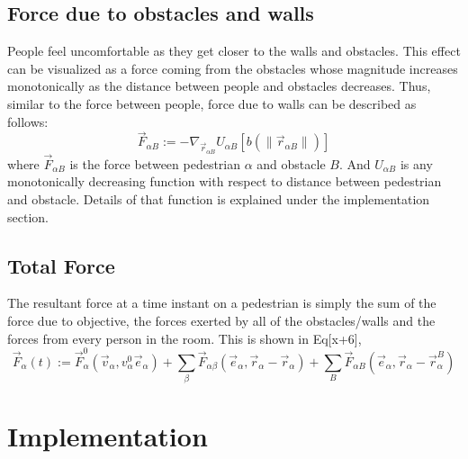 \documentclass[11pt]{article}
\begin{document}
\subsection{Force due to obstacles and walls}
People feel uncomfortable as they get closer to the walls and obstacles. This effect can be visualized as a force coming from the obstacles whose magnitude increases monotonically as the distance between people and obstacles decreases. Thus, similar to the force between people, force due to walls can be described as follows:
\begin{equation}
    \vec{F}_{\alpha B}:=-\nabla_{\vec{r}_{\alpha B}}U_{\alpha B}[b(\|\vec{r}_{\alpha B}\|)]
\end{equation}
where $ \vec{F}_{\alpha B}$ is the force between pedestrian $\alpha$ and obstacle $B$. And $U_{\alpha B}$ is any monotonically decreasing function with respect to distance between pedestrian and obstacle. Details of that function is explained under the implementation section.

\subsection{Total Force}
The resultant force at a time instant on a pedestrian is simply the sum of the force due to objective, the forces exerted by all of the obstacles/walls and the forces from every person in the room. This is shown in Eq[x+6],
\begin{equation}
    \vec{F}_\alpha(t):=\vec{F}_\alpha^0(\vec{v}_\alpha,v_\alpha^0\vec{e}_\alpha)+\sum_\beta\vec{F}_{\alpha\beta}(\vec{e}_\alpha,\vec{r}_\alpha-\vec{r}_\alpha)+\sum_B\vec{F}_{\alpha B}(\vec{e}_\alpha,\vec{r}_\alpha-\vec{r}_\alpha^B)
\end{equation}

\section{Implementation}
\end{document}
